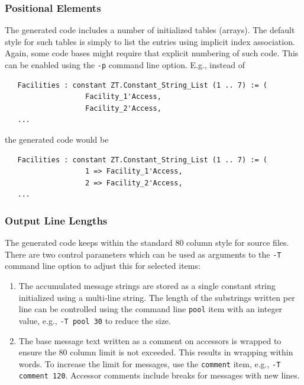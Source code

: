\subsubsection{Positional Elements}

The generated code includes a number of initialized tables (arrays).  The
default style for such tables is simply to list the entries using implicit
index association.  Again, some code bases might require that explicit
numbering of such code.  This can be enabled using the \verb|-p| command
line option.  E.g., instead of
\begin{xmpl}
\begin{verbatim}
   Facilities : constant ZT.Constant_String_List (1 .. 7) := (
                   Facility_1'Access,
                   Facility_2'Access,
   ...
\end{verbatim}
\end{xmpl}
the generated code would be
\begin{xmpl}
\begin{verbatim}
   Facilities : constant ZT.Constant_String_List (1 .. 7) := (
                   1 => Facility_1'Access,
                   2 => Facility_2'Access,
   ...
\end{verbatim}
\end{xmpl}

\subsubsection{Output Line Lengths}

The generated code keeps within the standard 80 column style for source files.
There are two control parameters which can be used as arguments to the \verb|-T|
command line option to adjust this for selected items:
\begin{enumerate}
\item The accumulated message strings are stored as a single constant string
      initialized using a multi-line string.  The length of the substrings
      written per line can be controlled using the command line \verb|pool|
      item with an integer value, e.g., \verb|-T pool 30| to reduce the size.
\item The base message text written as a comment on accessors is wrapped to
      ensure the 80 column limit is not exceeded.   This results in wrapping
      within words.  To increase the limit for messages, use the \verb|comment|
      item, e.g., \verb|-T comment 120|.  Accessor comments include breaks
      for messages with new lines.
\end{enumerate}

